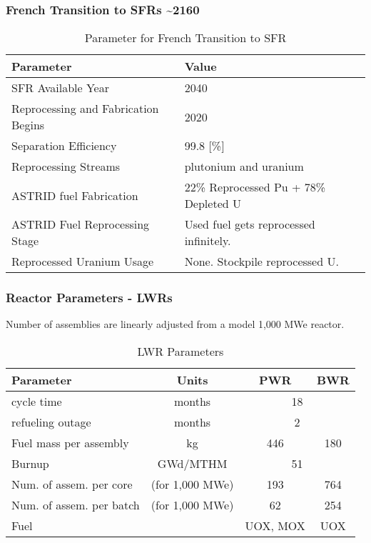 \begin{frame}
    \frametitle{French Transition to SFRs \textasciitilde 2160}
    
\begin{table}[h]
    \centering
    \begin{tabularx}{\textwidth}{bb}
        \hline
        Parameter & Value \\
        \hline
        \gls{SFR} Available Year & 2040 \\
        Reprocessing and Fabrication Begins & 2020 \\
        Separation Efficiency & 99.8 [\%] \\
        Reprocessing Streams & plutonium and uranium \\
        ASTRID fuel Fabrication &  \small{22\% Reprocessed Pu + 78\% Depleted U}  \\
        ASTRID Fuel Reprocessing Stage &  Used fuel gets reprocessed infinitely. \\
        Reprocessed Uranium Usage &  None. Stockpile reprocessed U. \\
        \hline
    \end{tabularx}
    \caption {Parameter for French Transition to \gls{SFR}}
    \label{tab:sim_france}
\end{table}

\end{frame}


\begin{frame}
    \frametitle{Reactor Parameters - \glspl{LWR} }
    Number of assemblies are linearly adjusted from a model 1,000 MWe reactor.
    \begin{table}[h]
    \centering
    \begin{tabularx}{\textwidth}{bccc}
        \hline
        Parameter & Units & PWR & BWR \\
        \hline
        cycle time & months & \multicolumn{2}{c}{18}   \\ 
        refueling outage & months & \multicolumn{2}{c}{2}\\
        Fuel mass per assembly & kg & 446 & 180 \\
        Burnup & GWd/MTHM & \multicolumn{2}{c}{51} \\
        \small{Num. of assem. per core} & (for 1,000 MWe) & 193  & 764 \\
        \small{Num. of assem. per batch} & (for 1,000 MWe) & 62 & 254 \\
        Fuel & & \gls{UOX}, \gls{MOX} & \gls{UOX}  \\
        \hline
    \end{tabularx}
    \caption {\gls{LWR} Parameters}
    \label{tab:lwr}
    \end{table}
\end{frame}


